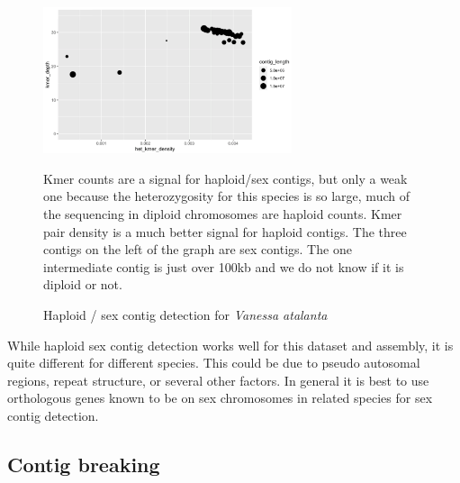 {\begin{figure}[htbp!]
\caption{Haploid / sex contig detection for \textit{Vanessa atalanta}}
\label{figure:sexcontig}
\begin{centering}
\includegraphics[width=0.65\textwidth]{sexcontig.png}
\par{Kmer counts are a signal for haploid/sex contigs, but only a weak one because the heterozygosity for this species is so large, much of the sequencing in diploid chromosomes are haploid counts. Kmer pair density is a much better signal for haploid contigs. The three contigs on the left of the graph are sex contigs. The one intermediate contig is just over 100kb and we do not know if it is diploid or not. }
\end{centering}
\end{figure}

\par{
While haploid sex contig detection works well for this dataset and assembly, it is quite different for different species. This could be due to pseudo autosomal regions, repeat structure, or several other factors. In general it is best to use orthologous genes known to be on sex chromosomes in related species for sex contig detection.
}

\subsection{Contig breaking}

}
